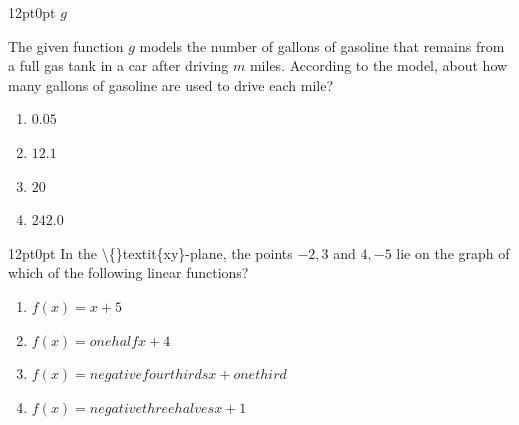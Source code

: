 \documentclass[11pt, twocolumn]{article}
\newcounter{questionnum}
\begin{document}
\vspace{6pt}\noindent
\begin{minipage}{\columnwidth}\raggedright
\noindent{}\par\vspace{8pt}
\begin{adjustwidth}{12pt}{0pt}
$g$

The given function $g$ models the number of gallons of gasoline that remains from a full gas tank in a car after driving $m$ miles. According to the model, about how many gallons of gasoline are used to drive each mile?
\begin{enumerate}[label=\Alph*),leftmargin=18pt,topsep=3pt,itemsep=2pt]
  \item $0.05$
  \item $12.1$
  \item $20$
  \item $242.0$
\end{enumerate}
\end{adjustwidth}
\end{minipage}\par

\vspace{6pt}\noindent
\begin{minipage}{\columnwidth}\raggedright
\noindent{}\par\vspace{8pt}
\begin{adjustwidth}{12pt}{0pt}
In the \textbackslash\{\}textit\{xy\}-plane, the points $-2 , 3$ and $4 , -5$ lie on the graph of which of the following linear functions?
\begin{enumerate}[label=\Alph*),leftmargin=18pt,topsep=3pt,itemsep=2pt]
  \item $f(x) = x + 5$
  \item $f(x) = one half x + 4$
  \item $f(x) = negative four thirds x + one third$
  \item $f(x) = negative three halves x + 1$
\end{enumerate}
\end{adjustwidth}
\end{minipage}\par
\end{document}
